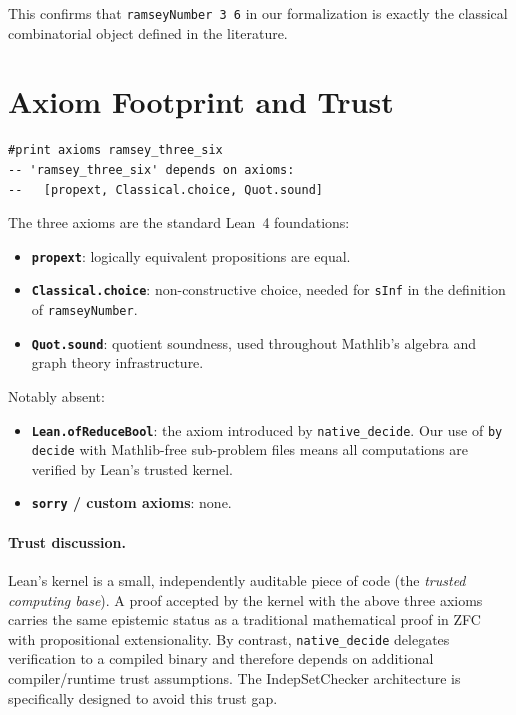 \documentclass[11pt]{article}
\newcommand{\lean}[1]{\texttt{#1}}
\begin{document}
\noindent
This confirms that \lean{ramseyNumber 3 6} in our formalization is exactly the
classical combinatorial object defined in the literature.

\section{Axiom Footprint and Trust}
\label{sec:axioms}

\begin{lstlisting}
#print axioms ramsey_three_six
-- 'ramsey_three_six' depends on axioms:
--   [propext, Classical.choice, Quot.sound]
\end{lstlisting}

\noindent
The three axioms are the standard Lean~4 foundations:
\begin{itemize}
  \item \textbf{\lean{propext}}: logically equivalent propositions are equal.
  \item \textbf{\lean{Classical.choice}}: non-constructive choice, needed
    for \lean{sInf} in the definition of \lean{ramseyNumber}.
  \item \textbf{\lean{Quot.sound}}: quotient soundness, used throughout
    Mathlib's algebra and graph theory infrastructure.
\end{itemize}

\noindent
Notably absent:

\begin{itemize}
  \item \textbf{\lean{Lean.ofReduceBool}}: the axiom introduced by
    \lean{native\_decide}.
    Our use of \lean{by decide} with Mathlib-free sub-problem files
    means all computations are verified by Lean's trusted kernel.
  \item \textbf{\lean{sorry} / custom axioms}: none.
\end{itemize}

\paragraph{Trust discussion.}
Lean's kernel is a small, independently auditable piece of code (the
\emph{trusted computing base}).
A proof accepted by the kernel with the above three axioms carries the same
epistemic status as a traditional mathematical proof in ZFC with
propositional extensionality.
By contrast, \lean{native\_decide} delegates verification to a compiled
binary and therefore depends on additional compiler/runtime trust assumptions.
The IndepSetChecker architecture is specifically designed to avoid this
trust gap.
\end{document}
